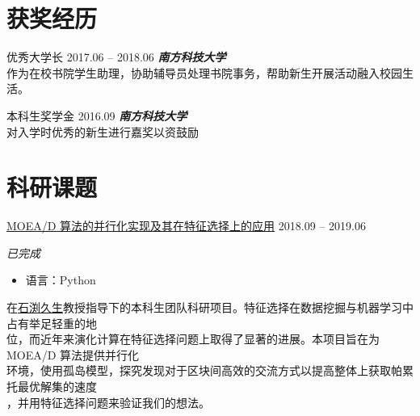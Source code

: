 \documentclass[hidelinks__VERSION__]{adamyi-cv}
\begin{document}
\section{\heir 获奖\heir 经历}

\begin{entrylist}


\entry
{\heir 优秀大学长}
{2017.06 -- 2018.06}
{\hei \emph{\textbf{\hei 南方科技大学}}\\
作为在校书院学生助理，协助辅导员处理书院事务，帮助新生开展活动融入校园生活。
}


\entry
{\heir 本科生奖学金}
{2016.09}
{\hei \emph{\textbf{\hei 南方科技大学}}\\
对入学时优秀的新生进行嘉奖以资鼓励
}


\end{entrylist}


\section{\heir 科研\heir 课题}

\begin{entrylist}


\entry
{\href{https://github.com/hackroid/pMOEA-D}{\heir MOEA/D 算法的并行化实现及其在特征选择上的应用}}
{2018.09 -- 2019.06}
{\emph{\hei 已完成}
\begin{itemize}
    \item \hei 语言：Python
\end{itemize}
{\hei
在\href{http://cse.sustech.edu.cn/en/people/view/people_id/55/sort_id/9/pid/}{\hei 石渕久生}教授指导下的本科生团队科研项目。特征选择在数据挖掘与机器学习中占有举足轻重的地\\
位，而近年来演化计算在特征选择问题上取得了显著的进展。本项目旨在为 MOEA/D 算法提供并行化\\
环境，使用孤岛模型，探究发现对于区块间高效的交流方式以提高整体上获取帕累托最优解集的速度\\
，并用特征选择问题来验证我们的想法。
}}



\end{entrylist}
\end{document}
